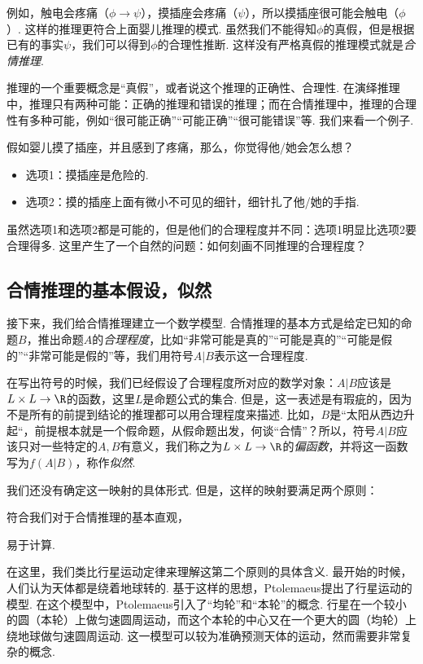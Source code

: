 例如，触电会疼痛（$\phi\to \psi$），摸插座会疼痛（$\psi$），所以摸插座很可能会触电（$\phi$）.  这样的推理更符合上面婴儿推理的模式. 虽然我们不能得知$\phi$的真假，但是根据已有的事实$\psi$，我们可以得到$\phi$的合理性推断. 这样没有严格真假的推理模式就是\emph{合情推理}.

推理的一个重要概念是“真假”，或者说这个推理的正确性、合理性. 在演绎推理中，推理只有两种可能：正确的推理和错误的推理；而在合情推理中，推理的合理性有多种可能，例如“很可能正确”“可能正确”“很可能错误”等. 我们来看一个例子. 

\begin{example}
    假如婴儿摸了插座，并且感到了疼痛，那么，你觉得他/她会怎么想？
    \begin{itemize}
        \item 选项1：摸插座是危险的. 
        \item 选项2：摸的插座上面有微小不可见的细针，细针扎了他/她的手指. 
    \end{itemize}
\end{example}
虽然选项1和选项2都是可能的，但是他们的合理程度并不同：选项1明显比选项2要合理得多. 这里产生了一个自然的问题：如何刻画不同推理的合理程度？

\subsection{合情推理的基本假设，似然}

接下来，我们给合情推理建立一个数学模型. 合情推理的基本方式是给定已知的命题$B$，推出命题$A$的\emph{合理程度}，比如“非常可能是真的”“可能是真的”“可能是假的”“非常可能是假的”等，我们用符号$A|B$表示这一合理程度. 

在写出符号的时候，我们已经假设了合理程度所对应的数学对象：$A|B$应该是$L\times L\to\R$的函数，这里$L$是命题公式的集合. 但是，这一表述是有瑕疵的，因为不是所有的前提到结论的推理都可以用合理程度来描述. 比如，$B$是“太阳从西边升起“，前提根本就是一个假命题，从假命题出发，何谈“合情”？所以，符号$A|B$应该只对一些特定的$A,B$有意义，我们称之为$L\times L\to\R$的\emph{偏函数}，并将这一函数写为$f(A|B)$，称作\emph{似然}.

我们还没有确定这一映射的具体形式. 但是，这样的映射要满足两个原则：
\begin{enumerate*}
    \item 符合我们对于合情推理的基本直观，
    \item 易于计算.
\end{enumerate*}

在这里，我们类比行星运动定律来理解这第二个原则的具体含义. 最开始的时候，人们认为天体都是绕着地球转的. 基于这样的思想，Ptolemaeus提出了行星运动的模型. 在这个模型中，Ptolemaeus引入了“均轮”和“本轮”的概念. 行星在一个较小的圆（本轮）上做匀速圆周运动，而这个本轮的中心又在一个更大的圆（均轮）上绕地球做匀速圆周运动. 这一模型可以较为准确预测天体的运动，然而需要非常复杂的概念. 

